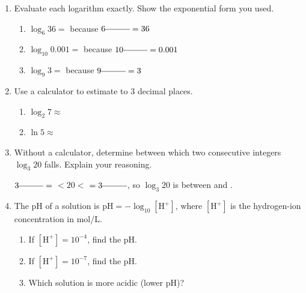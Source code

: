 \documentclass[10pt]{article}
\begin{document}
\vspace{0.08in}

\begin{tcolorbox}[colback=white, colframe=black!40,
    title=\textbf{Tier A --- Apply},
    fonttitle=\bfseries, arc=2mm, left=3mm, right=3mm, top=2mm, bottom=2mm]

\begin{enumerate}[itemsep=10pt]

  \item Evaluate each logarithm exactly. Show the exponential form you used.
        \begin{enumerate}[label=(\alph*), itemsep=4pt]
          \item $\log_6 36 = $ \blank{2.5cm} \hspace{1em} because $6^{\blank{1cm}} = 36$
          \item $\log_{10} 0.001 = $ \blank{2.5cm} \hspace{1em} because $10^{\blank{1cm}} = 0.001$
          \item $\log_9 3 = $ \blank{2.5cm} \hspace{1em} because $9^{\blank{1cm}} = 3$
        \end{enumerate}

  \item Use a calculator to estimate to 3 decimal places.
        \begin{enumerate}[label=(\alph*), itemsep=4pt]
          \item $\log_2 7 \approx $ \blank{3cm}
          \item $\ln 5 \approx $ \blank{3cm}
        \end{enumerate}

  \item Without a calculator, determine between which two consecutive integers $\log_3 20$ falls.
        Explain your reasoning.

        \vspace{0.04in}
        $3^{\blank{1cm}} = $ \blank{1.5cm} $< 20 <$ \blank{1.5cm} $= 3^{\blank{1cm}}$,
        so $\log_3 20$ is between \blank{1cm} and \blank{1cm}.

  \item The pH of a solution is $\text{pH} = -\log_{10}[\text{H}^+]$, where $[\text{H}^+]$
        is the hydrogen-ion concentration in mol/L.
        \begin{enumerate}[label=(\alph*), itemsep=4pt]
          \item If $[\text{H}^+] = 10^{-4}$, find the pH. \blank{3cm}
          \item If $[\text{H}^+] = 10^{-7}$, find the pH. \blank{3cm}
          \item Which solution is more acidic (lower pH)? \blank{3cm}
        \end{enumerate}

\end{enumerate}
\end{tcolorbox}
\end{document}
